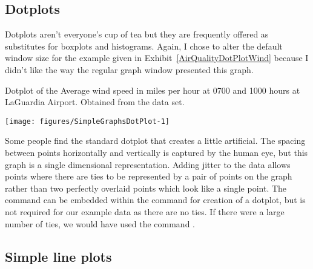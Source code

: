 \subsection{Dotplots} 
 
Dotplots aren't everyone's cup of tea but they are frequently offered as substitutes for boxplots and histograms. Again, I chose to alter the default window size for the example given in Exhibit~\ref{AirQualityDotPlotWind} 
because I didn't like the way the regular graph window presented this graph. 
\begin{exhibit} 
\begin{center} 
\caption{Dotplot of the Average wind speed in miles per hour at 0700 and 1000 hours at LaGuardia Airport. Obtained from the  data set.} 
\label{AirQualityDotPlotWind} 

\begin{Schunk}

\texttt{[image: figures/SimpleGraphsDotPlot-1]} \end{Schunk}

\end{center} 
\end{exhibit} 
 
Some people find the standard dotplot that \R{} creates a little artificial. The spacing between points horizontally and vertically is captured by the human eye, but this graph is a single dimensional representation. Adding jitter to the data allows points where there are ties to be represented by a pair of points on the graph rather than two perfectly overlaid points which look like a single point. The  command can be embedded within the command for creation of a dotplot, but is not required for our example data as there are no ties. If there were a large number of ties, we would have used the command . 
 
 
 
\subsection{Simple line plots} 
 
